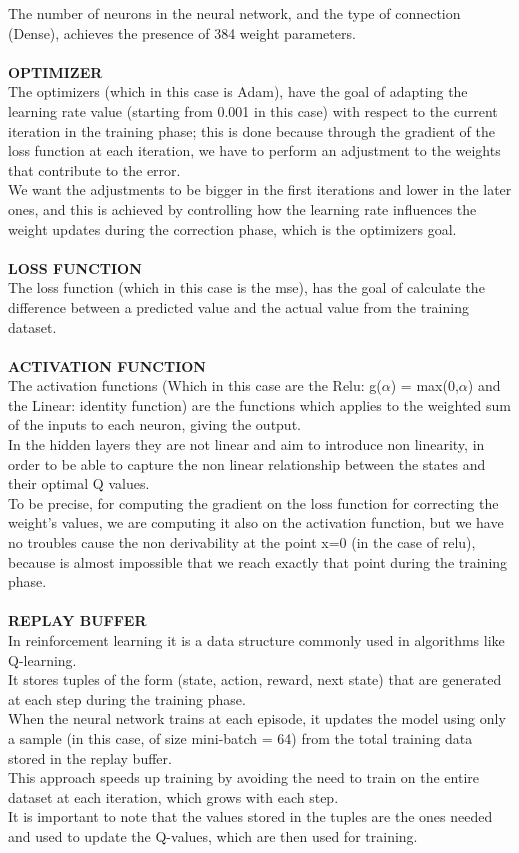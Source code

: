 \documentclass{article}
\begin{document}
The number of neurons in the neural network, and the type of connection (Dense), achieves the presence of 384 weight parameters.
\\
\\
\textbf{OPTIMIZER}
\\
The optimizers (which in this case is Adam), have the goal of adapting the learning rate value (starting from 0.001 in this case) with respect to the current iteration in the training phase; this is done because through the gradient of the loss function at each iteration, we have to perform an adjustment to the weights that contribute to the error.
\\
We want the adjustments to be bigger in the first iterations and lower in the later ones, and this is achieved by controlling how the learning rate influences the weight updates during the correction phase, which is the optimizers goal.
\\
\\
\textbf{LOSS FUNCTION}
\\
The loss function (which in this case is the mse), has the goal of calculate the difference between a predicted value and the actual value from the training dataset.
\\
\\
\textbf{ACTIVATION FUNCTION}
\\
The activation functions (Which in this case are the Relu: g($\alpha$) = max(0,$\alpha$) and the Linear: identity function) are the functions which applies to the weighted sum of the inputs to each neuron, giving the output.
\\
In the hidden layers they are not linear and aim to introduce non linearity, in order to be able to capture the non linear relationship between the states and their optimal Q values.
\\
To be precise, for computing the gradient on the loss function for correcting the weight's values, we are computing it also on the activation function, but we have no troubles cause the non derivability at the point x=0 (in the case of relu), because is almost impossible that we reach exactly that point during the training phase.
\\
\\
\textbf{REPLAY BUFFER}
\\
In reinforcement learning it is a data structure commonly used in algorithms like Q-learning.
\\
It stores tuples of the form (state, action, reward, next state) that are generated at each step during the training phase.
\\
When the neural network trains at each episode, it updates the model using only a sample (in this case, of size mini-batch = 64) from the total training data stored in the replay buffer. 
\\
This approach speeds up training by avoiding the need to train on the entire dataset at each iteration, which grows with each step.
\\
It is important to note that the values stored in the tuples are the ones needed and used to update the Q-values, which are then used for training.
\end{document}
